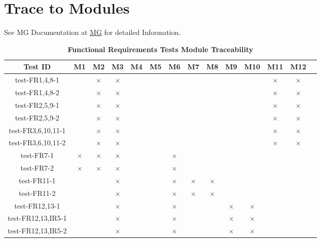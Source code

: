 \documentclass[12pt, titlepage]{article}
\begin{document}
\newpage
		
\section{Trace to Modules}

See MG Documentation at \href{https://github.com/PKALXI/RapidCare/blob/main/docs/Design/SoftArchitecture/MG.pdf} {MG} for detailed Information.\\

\begin{table}[H]
  \centering
  \begin{tabular}{|c|c|c|c|c|c|c|c|c|c|c|c|c|c|}
  \hline
  Test ID & M1 & M2 & M3 & M4 & M5 & M6 & M7 & M8 & M9 & M10 & M11 & M12 \\
  \hline
  test-FR1,4,8-1 & & $\times$ & $\times$ & & & & & & & & $\times$ & $\times$ \\
  \hline
  test-FR1,4,8-2 & & $\times$ & $\times$ & & & & & & & & $\times$ & $\times$ \\
  \hline
  test-FR2,5,9-1 & & $\times$ & $\times$ & & & & & & & & $\times$ & $\times$ \\
  \hline
  test-FR2,5,9-2 & & $\times$ & $\times$ & & & & & & & & $\times$ & $\times$ \\
  \hline
  test-FR3,6,10,11-1 & & $\times$ & $\times$ & & & & & & & & $\times$ & $\times$ \\
  \hline
  test-FR3,6,10,11-2 & & $\times$ & $\times$ & & & & & & & & $\times$ & $\times$ \\
  \hline
  test-FR7-1 & $\times$ & $\times$ & $\times$ & & & $\times$ & & & & & & \\
  \hline
  test-FR7-2 & $\times$ & $\times$ & $\times$ & & & $\times$ & & & & & & \\
  \hline
  test-FR11-1 & & & $\times$ & & & $\times$ & $\times$ & $\times$ & & & & \\
  \hline
  test-FR11-2 & & & $\times$ & & & $\times$ & $\times$ & $\times$ & & & & \\
  \hline
  test-FR12,13-1 & & & $\times$ & & & $\times$ & & & $\times$ & $\times$ & & \\
  \hline
  test-FR12,13,IR5-1 & & & $\times$ & & & $\times$ & & & $\times$ & $\times$ & & \\
  \hline
  test-FR12,13,IR5-2 & & & $\times$ & & & $\times$ & & & $\times$ & $\times$ & & \\
  \hline
\end{tabular}
\caption{\bf Functional Requirements Tests Module Traceability} \label{tab:fr-test-traceability}
\end{table}
\end{document}

